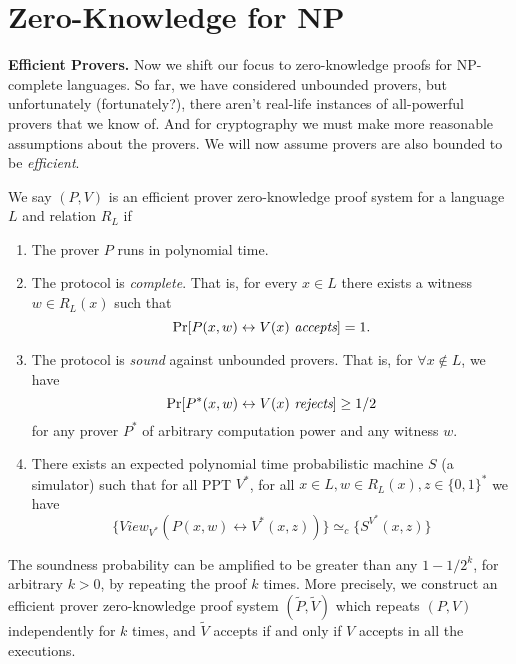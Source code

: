 
\section{Zero-Knowledge for NP}

\noindent\textbf{Efficient Provers.} Now we shift our focus to zero-knowledge proofs for NP-complete languages. So far, we have considered unbounded provers, but unfortunately (fortunately?), there aren't real-life instances of all-powerful provers that we know of. And for cryptography we must make more reasonable assumptions about the provers.  We will now assume provers are also bounded to be \emph{efficient}. \smallskip

\begin{definition}
We say $(P, V)$ is an efficient prover zero-knowledge proof system for a language $L$ and relation $R_L$ if \begin{enumerate}

\item The prover $P$ runs in polynomial time.

\item The protocol is \emph{complete}. That is, for every $x \in L$ there exists a witness $w \in R_L (x)$ such that $$\Pr [P(x,w) \leftrightarrow V(x) \ \emph{accepts}] = 1.$$

\item The protocol is \emph{sound} against unbounded provers. That is, for $\forall x \notin L$, we have $$\Pr [P^*(x,w) \leftrightarrow V(x) \ \emph{rejects}] \geq 1/2$$ for any prover $P^*$ of arbitrary computation power and any witness $w$.

\item There exists an expected polynomial time probabilistic machine $S$ (a simulator) such that for all PPT $V^*$, for all $x \in L, w \in R_L (x), z \in \{ 0, 1 \}^*$ we have $$\{ View_{V^*} (P(x,w) \leftrightarrow V^* (x,z)) \} \simeq_c \{ S^{V^*} (x,z) \} $$ \end{enumerate}

\end{definition}

The soundness probability can be amplified to be greater than any $1 - 1/2^k$, for arbitrary $k > 0$, by repeating the proof $k$ times. More precisely, we construct an efficient prover zero-knowledge proof system $(\tilde P, \tilde V)$ which repeats $(P,V)$ independently for $k$ times, and $\tilde V$ accepts if and only if $V$ accepts in all the executions.

